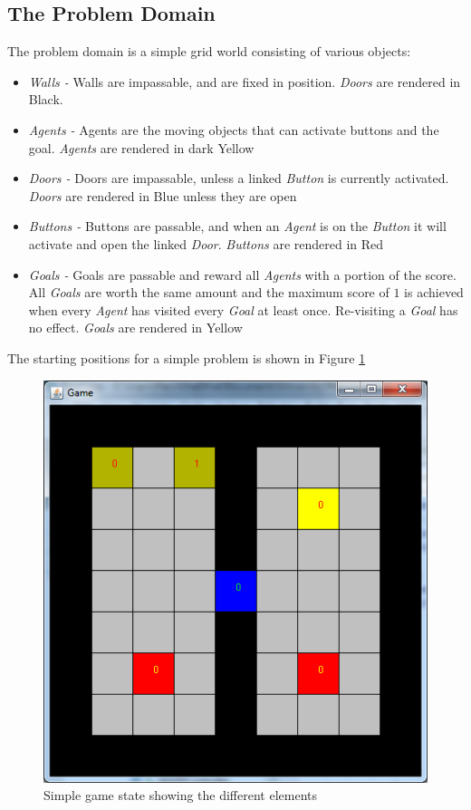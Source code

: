 \documentclass{IEEEtran}
\begin{document}
\subsection{The Problem Domain}
The problem domain is a simple grid world consisting of various objects:
\begin{itemize}
\item{\emph{Walls -} Walls are impassable, and are fixed in position. \emph{Doors} are rendered in Black.}
\item{\emph{Agents -} Agents are the moving objects that can activate buttons and the goal. \emph{Agents} are rendered in dark Yellow}
\item{\emph{Doors -} Doors are impassable, unless a linked \emph{Button} is currently activated. \emph{Doors} are rendered in Blue unless they are open}
\item{\emph{Buttons -} Buttons are passable, and when an \emph{Agent} is on the \emph{Button} it will activate and open the linked \emph{Door}. \emph{Buttons} are rendered in Red}
\item{\emph{Goals -} Goals are passable and reward all \emph{Agents} with a portion of the score. All \emph{Goals} are worth the same amount and the maximum score of $1$ is achieved when every \emph{Agent} has visited every \emph{Goal} at least once. Re-visiting a \emph{Goal} has no effect. \emph{Goals} are rendered in Yellow}
\end{itemize}

The starting positions for a simple problem is shown in Figure \ref{InitialState}
\begin{figure}[ht]
\includegraphics[scale=0.5]{InitialState}
\caption{Simple game state showing the different elements}
\label{InitialState}
\end{figure}
\end{document}
